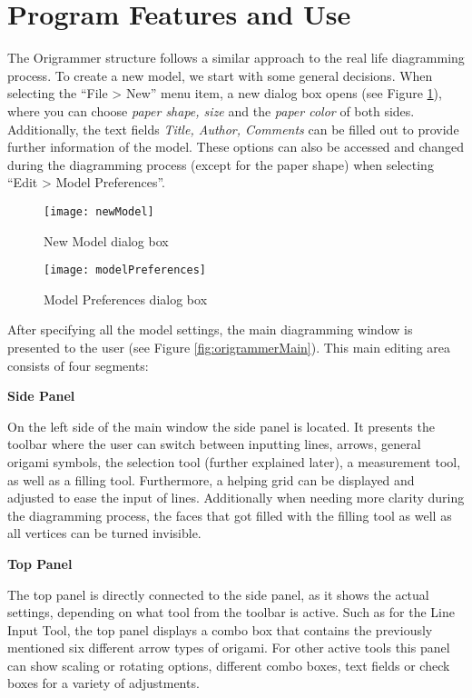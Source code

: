 
\section{Program Features and Use}
\label{program}

The Origrammer structure follows a similar approach to the real life diagramming process. To create a new model, we start with some general decisions. When selecting the ``File > New'' menu item, a new dialog box opens (see Figure \ref{fig:newModel}), where you can choose \emph{paper shape, size} and the \emph{paper color} of both sides. Additionally, the text fields \emph{Title, Author, Comments} can be filled out to provide further information of the model. These options can also be accessed and changed during the diagramming process (except for the paper shape) when selecting ``Edit > Model Preferences''. 

\begin{figure}[h]
	\centering
	\texttt{[image: newModel]}
	\caption{New Model dialog box}
	\label{fig:newModel}
\end{figure}


\begin{figure}[h]
	\centering
	\texttt{[image: modelPreferences]}
	\caption{Model Preferences dialog box}
	\label{fig:modelPreferences}
\end{figure}

After specifying all the model settings, the main diagramming window is presented to the user (see Figure \ref{fig:origrammerMain}). This main editing area consists of four segments:


\textbf{Side Panel}

On the left side of the main window the side panel is located. It presents the toolbar where the user can switch between inputting lines, arrows, general origami symbols, the selection tool (further explained later), a measurement tool, as well as a filling tool. Furthermore, a helping grid can be displayed and adjusted to ease the input of lines. Additionally when needing more clarity during the diagramming process, the faces that got filled with the filling tool as well as all vertices can be turned invisible.

\textbf{Top Panel}

The top panel is directly connected to the side panel, as it shows the actual settings, depending on what tool from the toolbar is active. Such as for the Line Input Tool, the top panel displays a combo box that contains the previously mentioned six different arrow types of origami. For other active tools this panel can show scaling or rotating options, different combo boxes, text fields or check boxes for a variety of adjustments.


